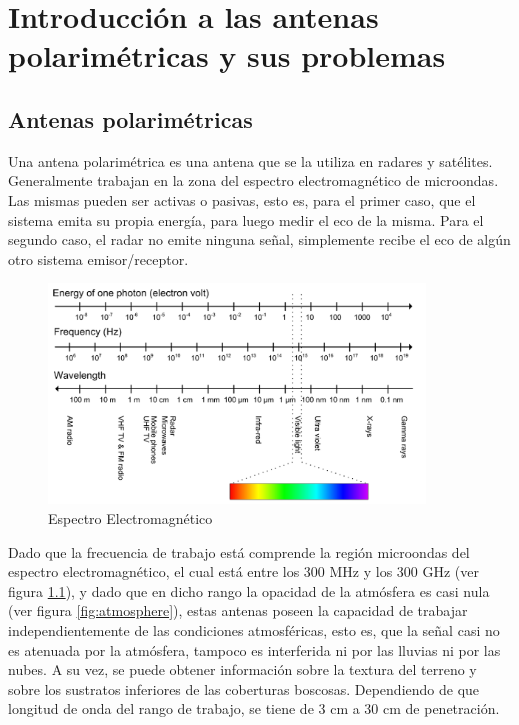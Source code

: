 
\chapter{Introducción a las antenas polarimétricas y sus problemas} %
\label{ch:phasedArray}

\section{Antenas polarimétricas}

Una antena polarimétrica es una antena que se la utiliza en radares y satélites. Generalmente trabajan en la
zona del espectro electromagnético de microondas. Las mismas pueden ser activas o pasivas, esto es, para el
primer caso, que el sistema emita su propia energía, para luego medir el eco de la misma. Para el segundo caso,
el radar no emite ninguna señal, simplemente recibe el eco de algún otro sistema emisor/receptor.

\begin{figure}[H]
 \centering
 \includegraphics[width=10cm]{gfx/electromagneticSpectrum.png}
 \caption{Espectro Electromagnético}
 \label{fig:spectrum}
\end{figure}


Dado que la frecuencia de trabajo está comprende la región microondas del espectro electromagnético, el cual está entre los 
300 MHz y los 300 GHz (ver figura \ref{fig:spectrum}), y dado que en dicho rango la opacidad de la atmósfera es casi nula 
(ver figura \ref{fig:atmosphere}), estas antenas poseen la capacidad de trabajar independientemente de las condiciones 
atmosféricas, esto es, que la señal casi no es atenuada por la atmósfera, tampoco es interferida ni por las lluvias ni por 
las nubes. A su vez, se puede obtener información sobre la textura del terreno y sobre los sustratos inferiores de las 
coberturas boscosas. Dependiendo de que longitud de onda del rango de trabajo, se tiene de 3 cm a 30 cm de penetración.


